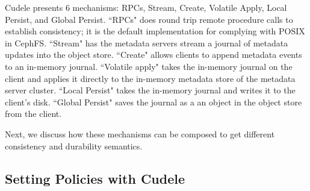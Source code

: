 Cudele presents 6 mechanisms: RPCs, Stream, Create, Volatile Apply, Local Persist, and Global
Persist. ``RPCs" does round trip remote procedure calls to establish
consistency; it is the default implementation for complying with POSIX in
CephFS. ``Stream" has the metadata servers stream a journal of metadata updates
into the object store. ``Create" allows clients to append metadata events to an
in-memory journal. ``Volatile apply" takes the in-memory journal on the client
and applies it directly to the in-memory metadata store of the metadata server
cluster. ``Local Persist" takes the in-memory journal and writes it to the client's
disk. ``Global Persist" saves the journal as a an object in the object store from the
client.

Next, we discuss how these mechanisms can be composed to get different
consistency and durability semantics. 


\subsection{Setting Policies with Cudele}
\label{sec:setting-policies-with-cudele}

